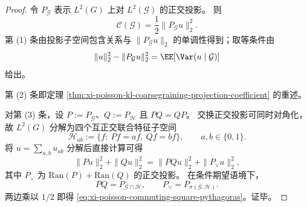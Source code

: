 \begin{proof}
令 \(P_{\mathcal G}\) 表示 \(L^2(G)\) 上对 \(L^2(\mathcal G)\) 的正交投影。
则
\[
\mathcal C(\mathcal G)=\frac12\|P_{\mathcal G}u\|_2^2.
\]
第 (1) 条由投影子空间包含关系与
\(
\|P_{\mathcal G}u\|_2
\)
的单调性得到；取等条件由
\[
\|u\|_2^2-\|P_{\mathcal G}u\|_2^2
=\EE[\Var(u\mid\mathcal G)]
\]
给出。

第 (2) 条即定理
\ref{thm:xi-poisson-kl-coarsegraining-projection-coefficient}
的重述。

对第 (3) 条，设 \(P:=P_{\mathcal G}\)、\(Q:=P_{\mathcal H}\) 且 \(PQ=QP\)。
交换正交投影可同时对角化，故 \(L^2(G)\) 分解为四个互正交联合特征子空间
\[
\mathcal H_{ab}:=\{f:\ Pf=af,\ Qf=bf\},\qquad a,b\in\{0,1\}.
\]
将 \(u=\sum_{a,b}u_{ab}\) 分解后直接计算可得
\[
\|Pu\|_2^2+\|Qu\|_2^2
=\|PQu\|_2^2+\|P_{\vee}u\|_2^2,
\]
其中 \(P_{\vee}\) 为 \(\mathrm{Ran}(P)+\mathrm{Ran}(Q)\) 的正交投影。
在条件期望语境下，
\[
PQ=P_{\mathcal G\cap\mathcal H},\qquad
P_{\vee}=P_{\sigma(\mathcal G,\mathcal H)}.
\]
两边乘以 \(1/2\) 即得
\eqref{eq:xi-poisson-commuting-square-pythagoras}。证毕。
\end{proof}

\endinput
